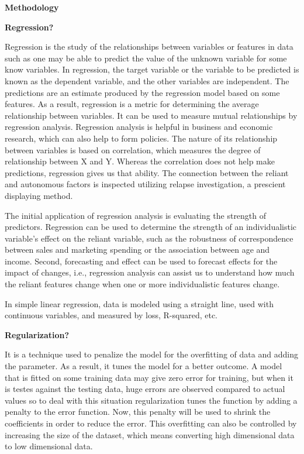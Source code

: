 \documentclass{article} %
\begin{document}
\noindent \textbf{Methodology}

\noindent \textbf{Regression?}

\noindent Regression is the study of the relationships between variables or features in data such as one may be able to predict the value of the unknown variable for some know variables. In regression, the target variable or the variable to be predicted is known as the dependent variable, and the other variables are independent. The predictions are an estimate produced by the regression model based on some features. As a result, regression is a metric for determining the average relationship between variables. It can be used to measure mutual relationships by regression analysis. Regression analysis is helpful in business and economic research, which can also help to form policies. The nature of its relationship between variables is based on correlation, which measures the degree of relationship between X and Y. Whereas the correlation does not help make predictions, regression gives us that ability. The connection between the reliant and autonomous factors is inspected utilizing relapse investigation, a prescient displaying method. 

\noindent The initial application of regression analysis is evaluating the strength of predictors. Regression can be used to determine the strength of an individualistic variable's effect on the reliant variable, such as the robustness of correspondence between sales and marketing spending or the association between age and income. Second, forecasting and effect can be used to forecast effects for the impact of changes, i.e., regression analysis can assist us to understand how much the reliant features change when one or more individualistic features change. 

\noindent In simple linear regression, data is modeled using a straight line, used with continuous variables, and measured by loss, R-squared, etc.

\noindent \textbf{Regularization?}

\noindent It is a technique used to penalize the model for the overfitting of data and adding the parameter. As a result, it tunes the model for a better outcome. A model that is fitted on some training data may give zero error for training, but when it is testes against the testing data, huge errors are observed compared to actual values so to deal with this situation regularization tunes the function by adding a penalty to the error function. Now, this penalty will be used to shrink the coefficients in order to reduce the error. This overfitting can also be controlled by increasing the size of the dataset, which means converting high dimensional data to low dimensional data.
\end{document}
